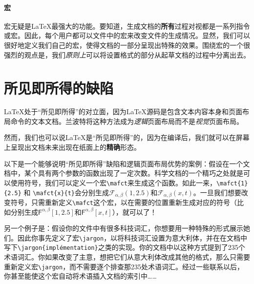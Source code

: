 \paragraph*{宏}宏无疑是\LaTeX 最强大的功能。要知道，生成文档的\textbf{所有}过程对视都是一系列指令或宏。因此，每个用户都可以文件中的宏来改变文件的生成情况。显然，我们可以很好地定义我们自己的宏，使得文档的一部分呈现出特殊的效果。围绕宏的一个很强烈的观点是，我们\textit{原则上}可以将设置格式的部分从起草文档的过程中分离出去。

\section*{所见即所得的缺陷}

\LaTeX 处于“所见即所得”的对立面，因为\LaTeX 源码是包含文本内容本身和页面布局命令的文本文档。兰波特将这种方法成为\textit{逻辑}页面布局而不是\textit{视觉}页面布局。

然而，我们也可以说\LaTeX 是“所见即所得”的，因为在编译后，我们就可以在屏幕上呈现出文档未来出现在纸面上的\textbf{精确}形态。

以下是一个能够说明“所见即所得”缺陷和逻辑页面布局优势的案例：假设在一个文档中，某个具有两个参数的函数出现了一定次数。科学文档的一个精巧之处就是可以使用符号，我们可以定义一个宏\texttt{\backslash mafct}来生成这个函数。如此一来，\texttt{\backslash mafct\{1\}\{2.5\}} 和 \texttt{\backslash mafct\{x\}\{t\}}会分别生成$\mathcal{F}_{\alpha, \beta}(1, 2.5)$和$\mathcal{F}_{\alpha, \beta}(x, t)$。一旦我们想要改变符号，只需重新定义\texttt{\backslash mafct}这个宏，以在需要的位置重新生成对应的符号（比如分别生成$\mathsf{F}^{\alpha, \beta}[1, 2.5]$和$\mathsf{F}^{\alpha, \beta}[x, t]$），就可以了！

另一个例子是：假设你的文件中有很多科技词汇，你想要用一种特殊的形式展示她们。因此你事先定义了宏\texttt{\backslash jargon}，以将科技词汇设置为意大利体，并在在文档中写下\texttt{\backslash jargon\{implémentation\}}之类的实现。你的文档中以这种方式提到了235个术语词汇。你如果改变了主意，想把它们从意大利体改成其他的格式，那么只需要重新定义宏\texttt{\backslash jargon}，而不需要逐个排查那235处术语词汇。经过一些联系以后，你甚至能使这个宏自动将术语插入文档的索引中……

